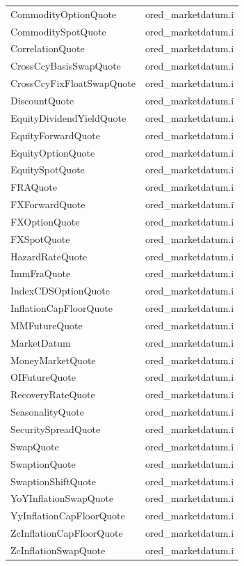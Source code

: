 \documentclass[12pt, a4paper]{report}
\begin{document}
\begin{appendix}
{\begin{longtable}{|l|l|}
CommodityOptionQuote & ored\_marketdatum.i \\
CommoditySpotQuote & ored\_marketdatum.i \\
CorrelationQuote & ored\_marketdatum.i \\
CrossCcyBasisSwapQuote & ored\_marketdatum.i \\
CrossCcyFixFloatSwapQuote & ored\_marketdatum.i \\
DiscountQuote & ored\_marketdatum.i \\
EquityDividendYieldQuote & ored\_marketdatum.i \\
EquityForwardQuote & ored\_marketdatum.i \\
EquityOptionQuote & ored\_marketdatum.i \\
EquitySpotQuote & ored\_marketdatum.i \\
FRAQuote & ored\_marketdatum.i \\
FXForwardQuote & ored\_marketdatum.i \\
FXOptionQuote & ored\_marketdatum.i \\
FXSpotQuote & ored\_marketdatum.i \\
HazardRateQuote & ored\_marketdatum.i \\
ImmFraQuote & ored\_marketdatum.i \\
IndexCDSOptionQuote & ored\_marketdatum.i \\
InflationCapFloorQuote & ored\_marketdatum.i \\
MMFutureQuote & ored\_marketdatum.i \\
MarketDatum & ored\_marketdatum.i \\
MoneyMarketQuote & ored\_marketdatum.i \\
OIFutureQuote & ored\_marketdatum.i \\
RecoveryRateQuote & ored\_marketdatum.i \\
SeasonalityQuote & ored\_marketdatum.i \\
SecuritySpreadQuote & ored\_marketdatum.i \\
SwapQuote & ored\_marketdatum.i \\
SwaptionQuote & ored\_marketdatum.i \\
SwaptionShiftQuote & ored\_marketdatum.i \\
YoYInflationSwapQuote & ored\_marketdatum.i \\
YyInflationCapFloorQuote & ored\_marketdatum.i \\
ZcInflationCapFloorQuote & ored\_marketdatum.i \\
ZcInflationSwapQuote & ored\_marketdatum.i \\

\end{longtable}}
\end{appendix}
\end{document}
